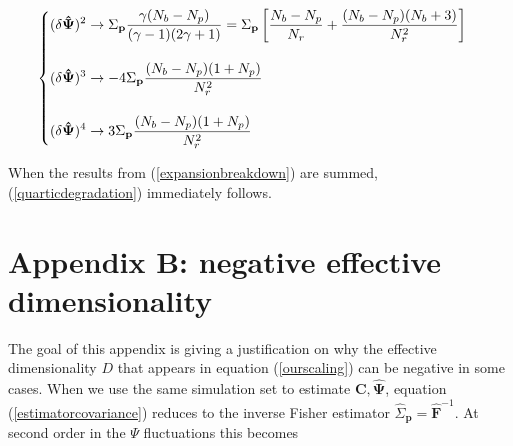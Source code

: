 \documentclass[reprint,aps,prd,superscriptaddress,showkeys,showpacs]{revtex4-1}
\newcommand{\bb}[1]{\mathbf{#1}}
\newcommand{\bbh}[1]{\mathbf{\hat{#1}}}
\newcommand{\h}[1]{\hat{#1}}
\begin{document}
\begin{widetext}
\begin{equation}
\label{expansionbreakdown}
\begin{cases}
\begin{displaystyle}
(\delta\bbh{\Psi})^2 \rightarrow \Sigma_\bb{p}\frac{\gamma(N_b-N_p)}{(\gamma-1)(2\gamma+1)} = \Sigma_\bb{p}\left[\frac{N_b-N_p}{N_r}+\frac{(N_b-N_p)(N_b+3)}{N_r^2}\right]
\end{displaystyle} \\ \\

\begin{displaystyle}
(\delta\bbh{\Psi})^3 \rightarrow -4\Sigma_\bb{p}\frac{(N_b-N_p)(1+N_p)}{N_r^2}
\end{displaystyle} \\ \\


\begin{displaystyle}
(\delta\bbh{\Psi})^4 \rightarrow 3\Sigma_\bb{p}\frac{(N_b-N_p)(1+N_p)}{N_r^2}
\end{displaystyle}

\end{cases}
\end{equation}
\end{widetext}
%
When the results from (\ref{expansionbreakdown}) are summed, (\ref{quarticdegradation}) immediately follows. 


\clearpage
\newpage
\section*{Appendix B: negative effective dimensionality}
\label{appendixB}

The goal of this appendix is giving a justification on why the effective dimensionality $D$ that appears in equation (\ref{ourscaling}) can be negative in some cases. When we use the same simulation set to estimate $\bb{C},\bbh{\Psi}$, equation (\ref{estimatorcovariance}) reduces to the inverse Fisher estimator $\h{\Sigma}_\bb{p}=\bbh{F}^{-1}$. At second order in the $\Psi$ fluctuations this becomes
\end{document}
